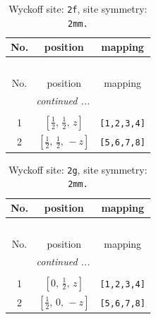 \documentclass[fleqn,8pt]{jsarticle}
\begin{document}
\renewcommand{\arraystretch}{1.2}
\begin{longtable}{ccc}
\caption{Wyckoff site: {\tt 2f}, site symmetry: {\tt 2mm.}}
 \\
 \hline \hline
No. & position & mapping \\ \hline \endfirsthead

\multicolumn{2}{l}{\tablename\ \thetable{}} \\
 \hline \hline
No. & position & mapping \\ \hline \endhead

 \hline \hline
\multicolumn{2}{r}{\footnotesize\it continued ...} \\ \endfoot

 \hline \hline
\multicolumn{2}{r}{} \\ \endlastfoot

1 & $\left[ \frac{1}{2},\, \frac{1}{2},\, z \right]$ & {\tt [1,2,3,4]} \\ \hline
2 & $\left[ \frac{1}{2},\, \frac{1}{2},\, - z \right]$ & {\tt [5,6,7,8]} \\
\end{longtable}
\renewcommand{\arraystretch}{1.2}
\begin{longtable}{ccc}
\caption{Wyckoff site: {\tt 2g}, site symmetry: {\tt 2mm.}}
 \\
 \hline \hline
No. & position & mapping \\ \hline \endfirsthead

\multicolumn{2}{l}{\tablename\ \thetable{}} \\
 \hline \hline
No. & position & mapping \\ \hline \endhead

 \hline \hline
\multicolumn{2}{r}{\footnotesize\it continued ...} \\ \endfoot

 \hline \hline
\multicolumn{2}{r}{} \\ \endlastfoot

1 & $\left[ 0,\, \frac{1}{2},\, z \right]$ & {\tt [1,2,3,4]} \\ \hline
2 & $\left[ \frac{1}{2},\, 0,\, - z \right]$ & {\tt [5,6,7,8]} \\
\end{longtable}
\renewcommand{\arraystretch}{1.2}
\end{document}
